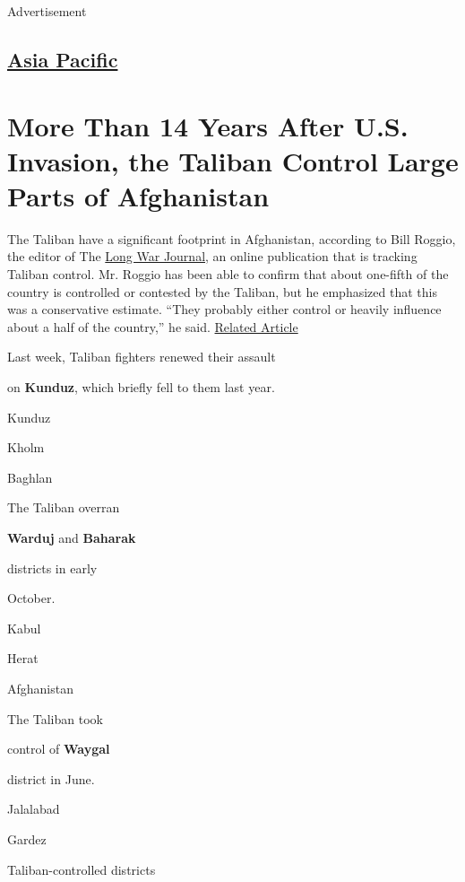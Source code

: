 Advertisement

\hypertarget{-asia-pacific-}{%
\subsection{\texorpdfstring{ \href{/section/world/asia}{Asia Pacific}
}{ Asia Pacific }}\label{-asia-pacific-}}

\hypertarget{more-than-14-years-after-us-invasion-the-taliban-control-large-parts-of-afghanistan}{%
\section{More Than 14 Years After U.S. Invasion, the Taliban Control
Large Parts of
Afghanistan}\label{more-than-14-years-after-us-invasion-the-taliban-control-large-parts-of-afghanistan}}

The Taliban have a significant footprint in Afghanistan, according to
Bill Roggio, the editor of The
\href{http://www.longwarjournal.org/}{Long War Journal}, an online
publication that is tracking Taliban control. Mr. Roggio has been able
to confirm that about one-fifth of the country is controlled or
contested by the Taliban, but he emphasized that this was a conservative
estimate. ``They probably either control or heavily influence about a
half of the country,'' he said.
\href{https://www.nytimes3xbfgragh.onion/interactive/2015/09/14/world/middleeast/syria-war-deaths.html}{Related
Article}

Last week, Taliban fighters renewed their assault

on \textbf{Kunduz}, which briefly fell to them last year.

Kunduz

Kholm

Baghlan

The Taliban overran

\textbf{Warduj} and \textbf{Baharak}

districts in early

October.

Kabul

Herat

Afghanistan

The Taliban took

control of \textbf{Waygal}

district in June.

Jalalabad

Gardez

Taliban-controlled districts

